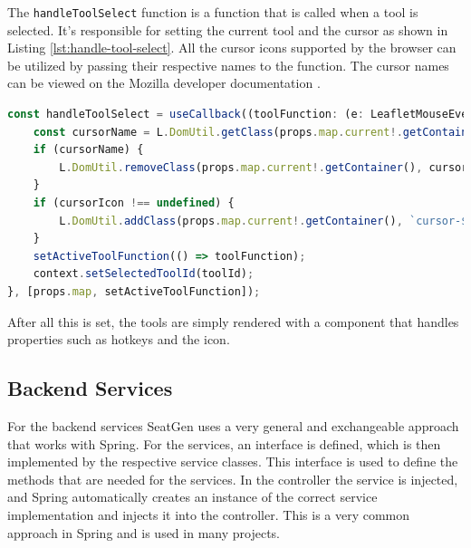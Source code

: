 The \texttt{handleToolSelect} function is a function that is called when a tool is selected. It's responsible for setting the current tool and the cursor as shown in Listing \ref{lst:handle-tool-select}. All the cursor icons supported by the browser can be utilized by passing their respective names to the function. The cursor names can be viewed on the Mozilla developer documentation \cite{MDNCursor}.

\begin{lstlisting}[language=TypeScript,caption={Handle Tool Select Function},label={lst:handle-tool-select}]
const handleToolSelect = useCallback((toolFunction: (e: LeafletMouseEvent) => void, toolId: string, cursorIcon?: string) => {
    const cursorName = L.DomUtil.getClass(props.map.current!.getContainer()).split(" ").find((it) => it.startsWith("cursor-"));
    if (cursorName) {
        L.DomUtil.removeClass(props.map.current!.getContainer(), cursorName);
    }
    if (cursorIcon !== undefined) {
        L.DomUtil.addClass(props.map.current!.getContainer(), `cursor-${cursorIcon}`);
    }
    setActiveToolFunction(() => toolFunction);
    context.setSelectedToolId(toolId);
}, [props.map, setActiveToolFunction]);
\end{lstlisting}

After all this is set, the tools are simply rendered with a component that handles properties such as hotkeys and the icon.

\subsection{Backend Services}
For the backend services SeatGen uses a very general and exchangeable approach that works with Spring. For the services, an interface is defined, which is then implemented by the respective service classes. This interface is used to define the methods that are needed for the services. In the controller the service is injected, and Spring automatically creates an instance of the correct service implementation and injects it into the controller. This is a very common approach in Spring and is used in many projects.